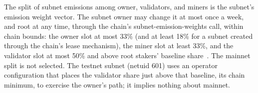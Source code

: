 The split of subnet emissions among owner, validators, and miners is the
subnet's emission weight vector. The subnet owner may change it at most once a
week, and root at any time, through the chain's subnet-emission-weights call,
within chain bounds: the owner slot at most 33\% (and at least 18\% for a
subnet created through the chain's lease mechanism), the miner slot at least 33\%, and the
validator slot at most 50\% and above root stakers' baseline
share~\cite{btemissionweights}. The mainnet split is not selected. The
testnet subnet (netuid 601) uses an operator configuration that places the
validator share just above that baseline, its chain minimum, to exercise the
owner's path; it implies nothing about mainnet.
